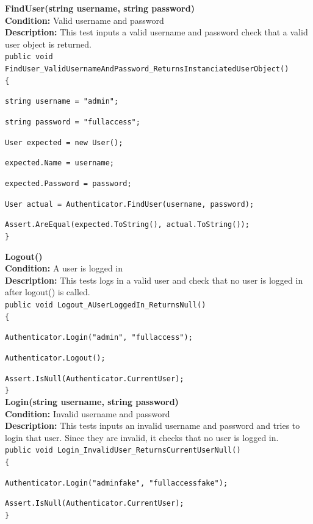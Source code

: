 \documentclass[12pt]{article}
\begin{document}
{\bfseries FindUser(string username, string password)}\\
{\bfseries Condition:} Valid username and password\\
{\bfseries Description:} This test inputs a valid username and password check that a valid user object is returned.\\
\texttt{public void FindUser\_ValidUsernameAndPassword\_ReturnsInstanciatedUserObject()}\\
\texttt{\{}\par
\texttt{string username = "admin";}\par
\texttt{string password = "fullaccess";}\par
\texttt{User expected = new User();}\par
\texttt{expected.Name = username;}\par
\texttt{expected.Password = password;}\par
\texttt{User actual = Authenticator.FindUser(username, password);}\par
\texttt{Assert.AreEqual(expected.ToString(), actual.ToString());}\\
\texttt{\}}
    
    \clearpage
    
{\bfseries Logout()}\\
{\bfseries Condition:} A user is logged in\\
{\bfseries Description:} This tests logs in a valid user and check that no user is logged in after logout() is called.\\

\texttt{public void Logout\_AUserLoggedIn\_ReturnsNull()}\\
\texttt{\{}\par
\texttt{Authenticator.Login("admin", "fullaccess");}\par
\texttt{Authenticator.Logout();}\par
\texttt{Assert.IsNull(Authenticator.CurrentUser);}\\
\texttt{\}}\\

{\bfseries Login(string username, string password)}\\
{\bfseries Condition:} Invalid username and password\\
{\bfseries Description:} This tests inputs an invalid username and password and tries to login that user. Since they are invalid, it checks that no user is logged in.\\

\texttt{public void Login\_InvalidUser\_ReturnsCurrentUserNull()}\\
\texttt{\{}\par
\texttt{Authenticator.Login("adminfake", "fullaccessfake");}\par
\texttt{Assert.IsNull(Authenticator.CurrentUser);}\\	 
\texttt{\}}
\end{document}
